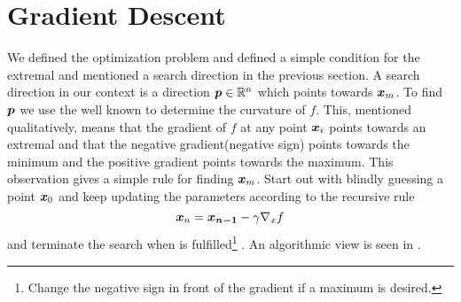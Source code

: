\section{Gradient Descent\label{sec:gradient_descent}}
    We defined the optimization problem and defined a simple condition for the
    extremal and mentioned a search direction in the previous section. A search
    direction in our context is a direction $\boldsymbol{{p}}\in\mathbb{R}^n$ which
    points towards $\boldsymbol{{x}}_m$. To find $\boldsymbol{{p}}$ we use the well known
     to determine the curvature of $f$. This,
    mentioned qualitatively, means that the gradient of $f$ at any point
    $\boldsymbol{{x}}_i$ points towards an extremal and that the negative
    gradient(negative sign) points towards the minimum and the positive
    gradient points towards the maximum. This observation gives a simple rule
    for finding $\boldsymbol{{x}}_m$. Start out with blindly guessing a point
    $\boldsymbol{{x}}_0$ and keep updating the parameters according to the recursive
    rule
        \begin{equation}
            \boldsymbol{{x}}_n = \boldsymbol{{x_{n-1}}} - \gamma\nabla_{x} f
            \label{eq:gdupdate}
        \end{equation}
    and terminate the search when  is
    fulfilled\footnote{Change the negative sign in front of the gradient if a
    maximum is desired.} \cite{numOptNocWrig}. An algorithmic view is seen in
    .

